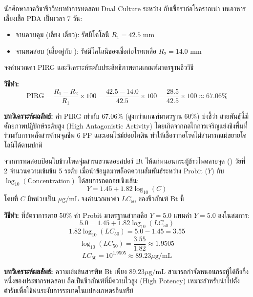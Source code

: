 \begin{worked}
นักศึกษาภาควิชาชีววิทยาทำการทดสอบ Dual Culture ระหว่าง  กับเชื้อราก่อโรครากเน่า  บนอาหารเลี้ยงเชื้อ PDA เป็นเวลา 7 วัน:
\begin{itemize}
    \item จานควบคุม (เลี้ยง  เดี่ยว): รัศมีโคโลนี $R_1 = 42.5\text{ mm}$
    \item จานทดสอบ (เลี้ยงคู่กับ ): รัศมีโคโลนีของเชื้อก่อโรคเหลือ $R_2 = 14.0\text{ mm}$
\end{itemize}
จงคำนวณค่า PIRG และวิเคราะห์ระดับประสิทธิภาพตามเกณฑ์มาตรฐานชีววิธี

\textbf{วิธีทำ:}
$$\text{PIRG} = \frac{R_1 - R_2}{R_1} \times 100 = \frac{42.5 - 14.0}{42.5} \times 100 = \frac{28.5}{42.5} \times 100 \approx 67.06\%$$

\textbf{บทวิเคราะห์ผลลัพธ์:} ค่า PIRG เท่ากับ 67.06\% (สูงกว่าเกณฑ์มาตรฐาน 60\%) บ่งชี้ว่า  สายพันธุ์นี้มีศักยภาพปฏิปักษ์ระดับสูง (High Antagonistic Activity) โดยเกิดจากกลไกการเจริญแย่งชิงพื้นที่ร่วมกับการหลั่งสารต้านจุลชีพ 6-PP และเอนไซม์ย่อยไคติน ทำให้เชื้อราก่อโรคไม่สามารถแผ่ขยายโคโลนีได้ตามปกติ
\end{worked}

\begin{worked}
จากการทดสอบป้อนใบข้าวโพดจุ่มสารแขวนลอยสปอร์ Bt ให้แก่หนอนกระทู้ข้าวโพดลายจุด () วัยที่ 2 จำนวนความเข้มข้น 5 ระดับ เมื่อนำข้อมูลมาพล็อตความสัมพันธ์ระหว่าง Probit ($Y$) กับ $\log_{10}(\text{Concentration})$ ได้สมการถดถอยเชิงเส้น:
$$Y = 1.45 + 1.82 \log_{10}(C)$$
โดยที่ $C$ มีหน่วยเป็น $\mu\text{g/mL}$ จงคำนวณหาค่า $LC_{50}$ ของชีวภัณฑ์ Bt นี้

\textbf{วิธีทำ:}
ที่อัตราการตาย 50\% ค่า Probit มาตรฐานสากลคือ $Y = 5.0$
แทนค่า $Y = 5.0$ ลงในสมการ:
$$5.0 = 1.45 + 1.82 \log_{10}(LC_{50})$$
$$1.82 \log_{10}(LC_{50}) = 5.0 - 1.45 = 3.55$$
$$\log_{10}(LC_{50}) = \frac{3.55}{1.82} \approx 1.9505$$
$$LC_{50} = 10^{1.9505} \approx 89.23 \mu\text{g/mL}$$

\textbf{บทวิเคราะห์ผลลัพธ์:} ความเข้มข้นสารพิษ Bt เพียง $89.23 \mu\text{g/mL}$ สามารถกำจัดหนอนกระทู้ได้ถึงกึ่งหนึ่งของประชากรทดสอบ ถือเป็นชีวภัณฑ์ที่มีความไวสูง (High Potency) เหมาะสำหรับนำไปตั้งตำรับเพื่อใช้พ่นระงับการระบาดในแปลงเกษตรอินทรีย์
\end{worked}

